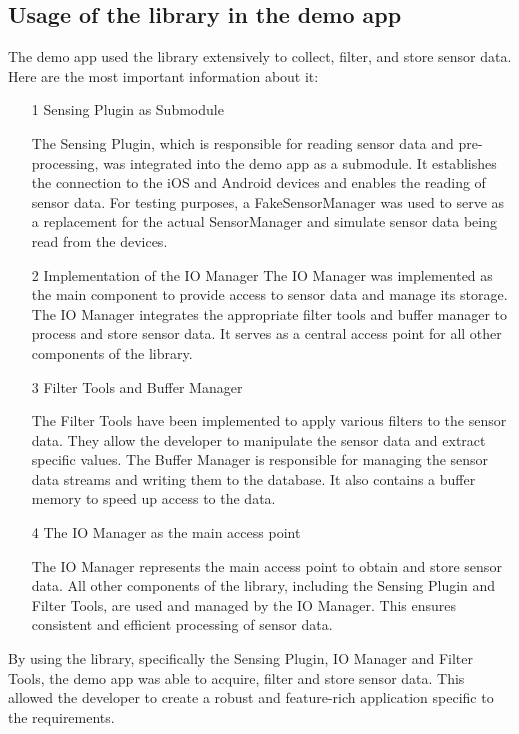 \documentclass[12pt]{article}
\newcounter{fr}
\begin{document}
\subsection{Usage of the library in the demo app}
    The demo app used the library extensively to collect, filter, and store sensor data. Here are the most important information about it:
    \begin{itemize}
        \item[1]Sensing Plugin as Submodule
        
        The Sensing Plugin, which is responsible for reading sensor data and pre-processing, was integrated into the demo app as a submodule. It establishes the connection to the iOS and Android devices and enables the reading of sensor data. For testing purposes, a FakeSensorManager was used to serve as a replacement for the actual SensorManager and simulate sensor data being read from the devices.
        \item[2] Implementation of the IO Manager
        The IO Manager was implemented as the main component to provide access to sensor data and manage its storage. The IO Manager integrates the appropriate filter tools and buffer manager to process and store sensor data. It serves as a central access point for all other components of the library.

        \item[3] Filter Tools and Buffer Manager

        The Filter Tools have been implemented to apply various filters to the sensor data. They allow the developer to manipulate the sensor data and extract specific values. The Buffer Manager is responsible for managing the sensor data streams and writing them to the database. It also contains a buffer memory to speed up access to the data.
        \item[4] The IO Manager as the main access point

        The IO Manager represents the main access point to obtain and store sensor data. All other components of the library, including the Sensing Plugin and Filter Tools, are used and managed by the IO Manager. This ensures consistent and efficient processing of sensor data.
      
        
  
    \end{itemize}
By using the library, specifically the Sensing Plugin, IO Manager and Filter Tools, the demo app was able to acquire, filter and store sensor data. This allowed the developer to create a robust and feature-rich application specific to the requirements.
\end{document}
